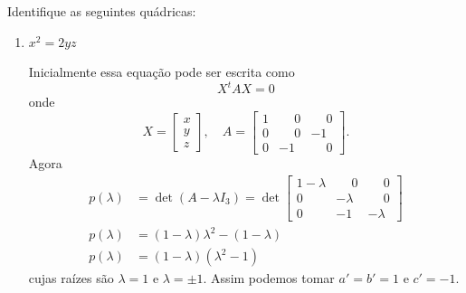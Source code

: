 \begin{exemplos}
    Identifique as seguintes quádricas:
    \begin{enumerate}
        \item $x^2 = 2yz$
              \begin{solucao}
                  Inicialmente essa equação pode ser escrita como
                  \[
                      X^tAX = 0
                  \]
                  onde
                  \[
                      X = \begin{bmatrix}
                          x \\ y\\ z
                      \end{bmatrix},\quad A = \begin{bmatrix}
                          1 & \phantom{-}0 & \phantom{-}0 \\
                          0 & \phantom{-}0 & -1           \\
                          0 & -1           & \phantom{-}0
                      \end{bmatrix}.
                  \]
                  Agora
                  \begin{align*}
                      p(\lambda) & = \det(A - \lambda I_3) = \det \begin{bmatrix}
                                                                      1 - \lambda & \phantom{-}0 & \phantom{-}0 \\
                                                                      0           & -\lambda     & \phantom{-}0 \\
                                                                      0           & -1           & -\lambda
                                                                  \end{bmatrix} \\
                      p(\lambda) & = (1 - \lambda)\lambda^2 - (1 - \lambda)                                 \\
                      p(\lambda) & = (1 - \lambda)(\lambda^2 - 1)
                  \end{align*}
                  cujas raízes são $\lambda = 1$ e $\lambda = \pm 1$. Assim podemos tomar $a' = b' = 1$ e $c' = -1$.


\end{solucao}
\end{enumerate}
\end{exemplos}
